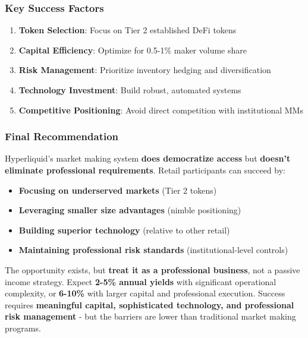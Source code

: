 \hypertarget{key-success-factors}{%
\subsubsection{\texorpdfstring{\textbf{Key Success
Factors}}{Key Success Factors}}\label{key-success-factors}}

\begin{enumerate}
\def\labelenumi{\arabic{enumi}.}
\tightlist
\item
  \textbf{Token Selection}: Focus on Tier 2 established DeFi tokens
\item
  \textbf{Capital Efficiency}: Optimize for 0.5-1\% maker volume share
\item
  \textbf{Risk Management}: Prioritize inventory hedging and
  diversification
\item
  \textbf{Technology Investment}: Build robust, automated systems
\item
  \textbf{Competitive Positioning}: Avoid direct competition with
  institutional MMs
\end{enumerate}

\hypertarget{final-recommendation}{%
\subsubsection{\texorpdfstring{\textbf{Final
Recommendation}}{Final Recommendation}}\label{final-recommendation}}

Hyperliquid's market making system \textbf{does democratize access} but
\textbf{doesn't eliminate professional requirements}. Retail
participants can succeed by:

\begin{itemize}
\tightlist
\item
  \textbf{Focusing on underserved markets} (Tier 2 tokens)
\item
  \textbf{Leveraging smaller size advantages} (nimble positioning)
\item
  \textbf{Building superior technology} (relative to other retail)
\item
  \textbf{Maintaining professional risk standards} (institutional-level
  controls)
\end{itemize}

The opportunity exists, but \textbf{treat it as a professional
business}, not a passive income strategy. Expect \textbf{2-5\% annual
yields} with significant operational complexity, or \textbf{6-10\%} with
larger capital and professional execution. Success requires
\textbf{meaningful capital, sophisticated technology, and professional
risk management} - but the barriers are lower than traditional market
making programs.
